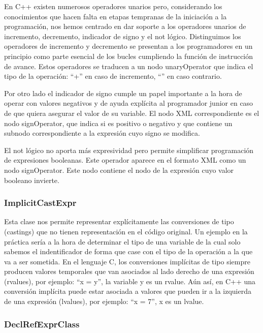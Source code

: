 En C++ existen numerosos operadores unarios pero, considerando los conocimientos que hacen falta en etapas tempranas de la iniciaci\'on a la programaci\'on, nos hemos centrado en dar soporte a los operadores unarios de incremento, decremento, indicador de signo y el not l\'ogico. Distinguimos los operadores de incremento y decremento se presentan a los programadores en un principio como parte esencial de los bucles cumpliendo la funci\'on de instrucci\'on de avance. Estos operadores se traducen a un nodo unaryOperator que indica el tipo de la operaci\'on: ``+'' en caso de incremento, ``'' en caso contrario.

Por otro lado el indicador de signo cumple un papel importante a la hora de operar con valores negativos y de ayuda expl\'icita al programador junior en caso de que quiera asegurar el valor de su variable. El nodo XML correspondiente es el nodo signOperator, que indica si es positivo o negativo y que contiene un subnodo correspondiente a la expresi\'on cuyo signo se modifica.

El not l\'ogico no aporta m\'as expresividad pero permite simplificar programaci\'on de expresiones booleanas. Este operador aparece en el formato XML como un nodo signOperator. Este nodo contiene el nodo de la expresi\'on cuyo valor booleano invierte.

\subsubsection*{ImplicitCastExpr}

Esta clase nos permite representar expl\'icitamente las conversiones de tipo (castings) que no tienen representaci\'on en el c\'odigo original. Un ejemplo en la pr\'actica ser\'ia a la hora de determinar el tipo de una variable de la cual solo sabemos el indentificador de forma que case con el tipo de la operaci\'on a la que va a ser sometida. En el lenguaje C, los conversiones impl\'icitas de tipo siempre producen valores temporales que van asociados al lado derecho de una expresi\'on (rvalues), por ejemplo: ``x = y'', la variable y es un rvalue. A\'un as\'i, en C++ una conversi\'on impl\'icita puede estar asociada a valores que pueden ir a la izquierda de una expresi\'on (lvalues), por ejemplo: ``x = 7'', x es un lvalue.

\subsubsection*{DeclRefExprClass}

